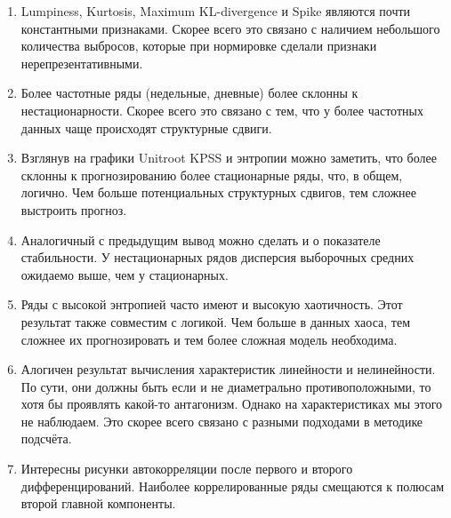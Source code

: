 \documentclass[a4paper,12pt]{article}
\begin{document}
\begin{enumerate}
	\item Lumpiness, Kurtosis, Maximum KL-divergence и Spike являются почти константными признаками. Скорее всего это связано с наличием небольшого количества выбросов, которые при нормировке сделали признаки нерепрезентативными.
	
	
	
	\item Более частотные ряды (недельные, дневные) более склонны к нестационарности. Скорее всего это связано с тем, что у более частотных данных чаще происходят структурные сдвиги. 
	
	
	\item Взглянув на графики Unitroot KPSS и энтропии можно заметить, что более склонны к прогнозированию более стационарные ряды, что, в общем, логично. Чем больше потенциальных структурных сдвигов, тем сложнее выстроить прогноз. 
	
	\item Аналогичный с предыдущим вывод можно сделать и о показателе стабильности. У нестационарных рядов дисперсия выборочных средних ожидаемо выше, чем у стационарных.

	\item Ряды с высокой энтропией часто имеют и высокую хаотичность. Этот результат также совместим с логикой. Чем больше в данных хаоса, тем сложнее их прогнозировать и тем более сложная модель необходима.
	
	\item Алогичен результат вычисления характеристик линейности и нелинейности. По сути, они должны быть если и не диаметрально противоположными, то хотя бы проявлять какой-то антагонизм. Однако на характеристиках мы этого не наблюдаем. Это скорее всего связано с разными подходами в методике подсчёта. 
	
	\item Интересны рисунки автокорреляции после первого и второго дифференцирований. Наиболее коррелированные ряды смещаются к полюсам второй главной компоненты. 
\end{enumerate}
\end{document}

